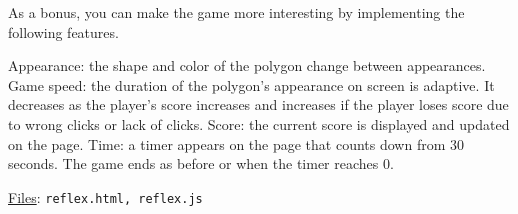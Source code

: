 \documentclass[addpoints]{exam}
\begin{document}
\begin{questions}
  As a bonus, you can make the game more interesting by implementing the following features.
  \begin{parts}
    \bonuspart[2] Appearance: the shape and color of the polygon change between appearances.
    \bonuspart[2] Game speed: the duration of the polygon's appearance on screen is adaptive. It decreases as the player's score increases and increases if the player loses score due to wrong clicks or lack of clicks.
    \bonuspart[2] Score: the current score is displayed and updated on the page.
    \bonuspart[4] Time: a timer appears on the page that counts down from 30 seconds. The game ends as before or when the timer reaches 0.
  \end{parts}
  \underline{Files}: {\tt reflex.html, reflex.js}
\end{questions}
\end{document}
